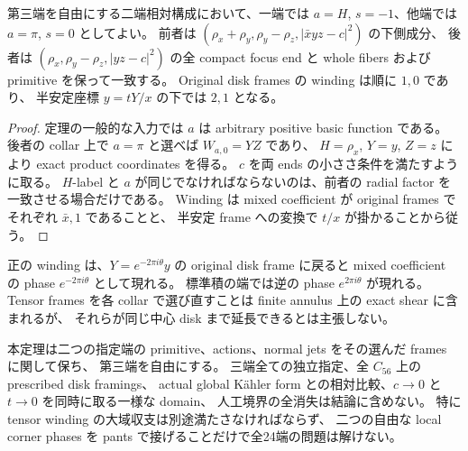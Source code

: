\begin{corollary}
\label{pe:central21}
第三端を自由にする二端相対構成において、一端では
$a=H$, $s=-1$、他端では $a=\pi$, $s=0$ としてよい。
前者は $(\rho_x+\rho_y,\rho_y-\rho_z,|\bar x yz-c|^2)$ の下側成分、
後者は $(\rho_x,\rho_y-\rho_z,|yz-c|^2)$ の全 compact focus end と
whole fibers および primitive を保って一致する。
Original disk frames の winding は順に $1,0$ であり、
半安定座標 $y=tY/x$ の下では $2,1$ となる。
\end{corollary}

\begin{proof}
定理の一般的な入力では $a$ は arbitrary positive basic function である。
後者の collar 上で $a=\pi$ と選べば $W_{a,0}=YZ$ であり、
$H=\rho_x$, $Y=y$, $Z=z$ により exact product coordinates を得る。
$c$ を両 ends の小ささ条件を満たすように取る。
$H$-label と $a$ が同じでなければならないのは、前者の radial factor を一致させる場合だけである。
Winding は mixed coefficient が original frames でそれぞれ $\bar x,1$ であることと、
半安定 frame への変換で $t/x$ が掛かることから従う。
\end{proof}

\begin{remark}[この構成が保つものと残すもの]\label{pe:scope}
正の winding は、$Y=e^{-2\pi i\theta}y$ の original disk frame に戻ると
mixed coefficient の phase $e^{-2\pi i\theta}$ として現れる。
標準積の端では逆の phase $e^{2\pi i\theta}$ が現れる。
Tensor frames を各 collar で選び直すことは finite annulus 上の exact shear に含まれるが、
それらが同じ中心 disk まで延長できるとは主張しない。

本定理は二つの指定端の primitive、actions、normal jets をその選んだ frames に関して保ち、
第三端を自由にする。
三端全ての独立指定、全 $C_{56}$ 上の prescribed disk framings、
actual global Kähler form との相対比較、$c\to0$ と $t\to0$ を同時に取る一様な domain、
人工境界の全消失は結論に含めない。
特に tensor winding の大域収支は別途満たさなければならず、
二つの自由な local corner phases を pants で接げることだけで全24端の問題は解けない。
\end{remark}

